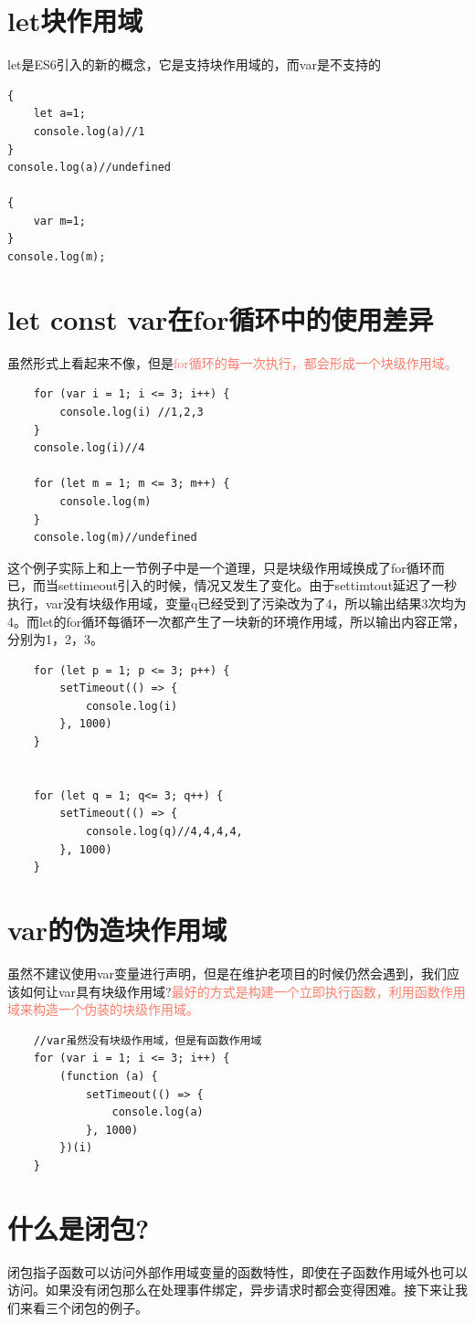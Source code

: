\documentclass[
	11pt,
	fleqn,
	a4paper,
]{LegrandOrangeBook}
\begin{document}
\section{let块作用域}
let是ES6引入的新的概念，它是支持块作用域的，而var是不支持的
\begin{verbatim}
{
    let a=1;
    console.log(a)//1
}
console.log(a)//undefined

{
    var m=1;
}
console.log(m);
\end{verbatim}
\section{let const var在for循环中的使用差异}
虽然形式上看起来不像，但是\textcolor{Salmon}{for循环的每一次执行，都会形成一个块级作用域。}
\begin{verbatim}
    for (var i = 1; i <= 3; i++) {
        console.log(i) //1,2,3
    }
    console.log(i)//4

    for (let m = 1; m <= 3; m++) {
        console.log(m)
    }
    console.log(m)//undefined
\end{verbatim}

这个例子实际上和上一节例子中是一个道理，只是块级作用域换成了for循环而已，而当settimeout引入的时候，情况又发生了变化。由于settimtout延迟了一秒执行，var没有块级作用域，变量q已经受到了污染改为了4，所以输出结果3次均为4。而let的for循环每循环一次都产生了一块新的环境作用域，所以输出内容正常，分别为1，2，3。
\begin{verbatim}
    for (let p = 1; p <= 3; p++) {
        setTimeout(() => {
            console.log(i)
        }, 1000)
    }


    for (let q = 1; q<= 3; q++) {
        setTimeout(() => {
            console.log(q)//4,4,4,4,
        }, 1000)
    }
\end{verbatim}
\section{var的伪造块作用域}
虽然不建议使用var变量进行声明，但是在维护老项目的时候仍然会遇到，我们应该如何让var具有块级作用域?\textcolor{Salmon}{最好的方式是构建一个立即执行函数，利用函数作用域来构造一个伪装的块级作用域。}
\begin{verbatim}
    //var虽然没有块级作用域，但是有函数作用域
    for (var i = 1; i <= 3; i++) {
        (function (a) {
            setTimeout(() => {
                console.log(a)
            }, 1000)
        })(i)
    }
\end{verbatim}
\section{什么是闭包?}
闭包指子函数可以访问外部作用域变量的函数特性，即使在子函数作用域外也可以访问。如果没有闭包那么在处理事件绑定，异步请求时都会变得困难。接下来让我们来看三个闭包的例子。
\end{document}
